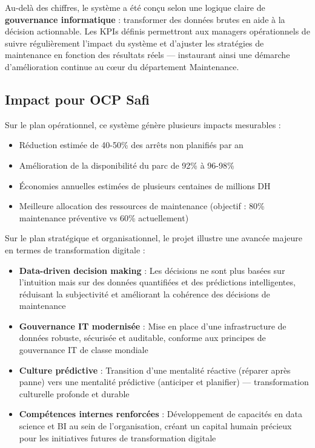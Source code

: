 \documentclass[a4paper,12pt]{report}
\begin{document}
Au-delà des chiffres, le système a été conçu selon une logique claire de \textbf{gouvernance informatique} : transformer des données brutes en aide à la décision actionnable. Les KPIs définis permettront aux managers opérationnels de suivre régulièrement l'impact du système et d'ajuster les stratégies de maintenance en fonction des résultats réels — instaurant ainsi une démarche d'amélioration continue au cœur du département Maintenance.

\subsection{Impact pour OCP Safi}

Sur le plan opérationnel, ce système génère plusieurs impacts mesurables :
\begin{itemize}
    \item Réduction estimée de 40-50\% des arrêts non planifiés par an
    \item Amélioration de la disponibilité du parc de 92\% à 96-98\%
    \item Économies annuelles estimées de plusieurs centaines de millions DH
    \item Meilleure allocation des ressources de maintenance (objectif : 80\% maintenance préventive vs 60\% actuellement)
\end{itemize}

Sur le plan stratégique et organisationnel, le projet illustre une avancée majeure en termes de transformation digitale :
\begin{itemize}
    \item \textbf{Data-driven decision making} : Les décisions ne sont plus basées sur l'intuition mais sur des données quantifiées et des prédictions intelligentes, réduisant la subjectivité et améliorant la cohérence des décisions de maintenance
    
    \item \textbf{Gouvernance IT modernisée} : Mise en place d'une infrastructure de données robuste, sécurisée et auditable, conforme aux principes de gouvernance IT de classe mondiale
    
    \item \textbf{Culture prédictive} : Transition d'une mentalité réactive (réparer après panne) vers une mentalité prédictive (anticiper et planifier) — transformation culturelle profonde et durable
    
    \item \textbf{Compétences internes renforcées} : Développement de capacités en data science et BI au sein de l'organisation, créant un capital humain précieux pour les initiatives futures de transformation digitale
\end{itemize}
\end{document}
